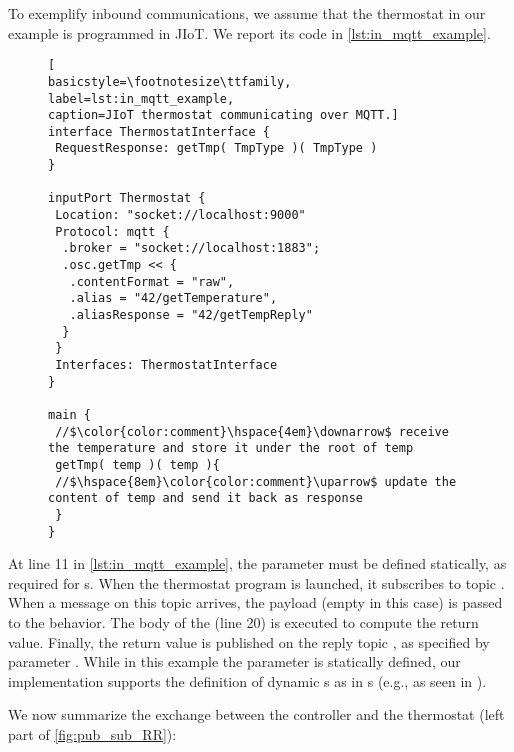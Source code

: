 To exemplify inbound  communications, we assume that the
thermostat in our example is programmed in JIoT. We report its code in
\cref{lst:in_mqtt_example}.

\begin{figure}[t]
 \begin{lstlisting}[
basicstyle=\footnotesize\ttfamily,
label=lst:in_mqtt_example,
caption=JIoT thermostat communicating over MQTT.]
interface ThermostatInterface {
 RequestResponse: getTmp( TmpType )( TmpType )
}

inputPort Thermostat {
 Location: "socket://localhost:9000"
 Protocol: mqtt {
  .broker = "socket://localhost:1883";
  .osc.getTmp << {
   .contentFormat = "raw",
   .alias = "42/getTemperature",
   .aliasResponse = "42/getTempReply"
  }
 }
 Interfaces: ThermostatInterface
}

main {
 //$\color{color:comment}\hspace{4em}\downarrow$ receive the temperature and store it under the root of temp
 getTmp( temp )( temp ){
 //$\hspace{8em}\color{color:comment}\uparrow$ update the content of temp and send it back as response
 }
}
\end{lstlisting}
\end{figure}

At line 11 in \cref{lst:in_mqtt_example}, the  parameter
must be defined statically, as required for s.
When the thermostat program is launched, it subscribes to topic
. When a message on this topic arrives, the payload
(empty in this case) is passed to the behavior. The body of the
 (line 20) is executed to compute the return value.
Finally, the return value is published on the reply topic
, as specified by  parameter
. While in this example the parameter
 is statically defined, our implementation supports the
definition of dynamic s as in s (e.g.,
as seen in ).

We now summarize the exchange between the controller and the thermostat (left
part of \cref{fig:pub_sub_RR}):

